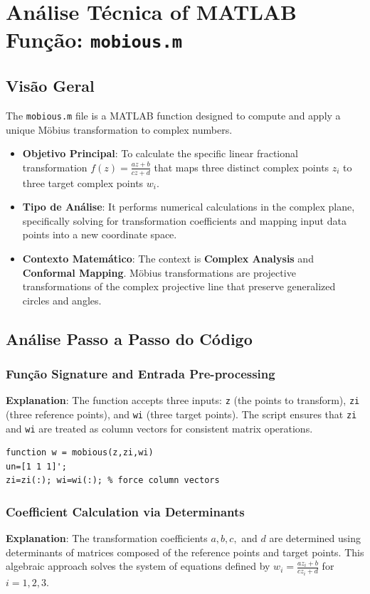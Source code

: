 
\chapter{Análise Técnica of MATLAB Função: \texttt{mobious.m}}
\section{Visão Geral}

The \texttt{mobious.m} file is a MATLAB function designed to compute and apply a unique M\"{o}bius transformation to complex numbers.

\begin{itemize}
    \item \textbf{Objetivo Principal}: To calculate the specific linear fractional transformation $f(z) = \frac{az+b}{cz+d}$ that maps three distinct complex points $z_i$ to three target complex points $w_i$.
    \item \textbf{Tipo de Análise}: It performs numerical calculations in the complex plane, specifically solving for transformation coefficients and mapping input data points into a new coordinate space.
    \item \textbf{Contexto Matemático}: The context is \textbf{Complex Analysis} and \textbf{Conformal Mapping}. M\"{o}bius transformations are projective transformations of the complex projective line that preserve generalized circles and angles.
\end{itemize}

\section{Análise Passo a Passo do Código}

\subsection{Função Signature and Entrada Pre-processing}
\textbf{Explanation}: The function accepts three inputs: \texttt{z} (the points to transform), \texttt{zi} (three reference points), and \texttt{wi} (three target points). The script ensures that \texttt{zi} and \texttt{wi} are treated as column vectors for consistent matrix operations.

\begin{lstlisting}
function w = mobious(z,zi,wi)
un=[1 1 1]';
zi=zi(:); wi=wi(:); % force column vectors
\end{lstlisting}

\subsection{Coefficient Calculation via Determinants}
\textbf{Explanation}: The transformation coefficients $a, b, c,$ and $d$ are determined using determinants of matrices composed of the reference points and target points. This algebraic approach solves the system of equations defined by $w_i = \frac{az_i+b}{cz_i+d}$ for $i=1, 2, 3$.

